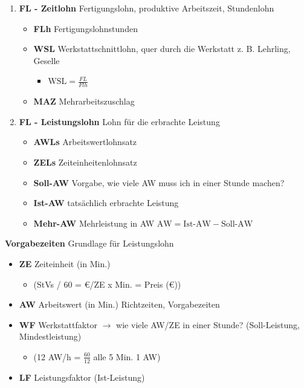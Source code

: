 \begin{enumerate}
\item
  \textbf{FL - Zeitlohn} Fertigungslohn, produktive Arbeitszeit,
  Stundenlohn

  \begin{itemize}
  \item
    \textbf{FLh} Fertigungslohnstunden
  \item
    \textbf{WSL} Werkstattschnittlohn, quer durch die Werkstatt z. B.
    Lehrling, Geselle

    \begin{itemize}
    \item
      $\boxed{\text{WSL} = \frac{FL}{Flh}}$
    \end{itemize}
  \item
    \textbf{MAZ} Mehrarbeitszuschlag
  \end{itemize}
\item
  \textbf{FL - Leistungslohn} Lohn für die erbrachte Leistung

  \begin{itemize}
  \item
    \textbf{AWLs} Arbeitswertlohnsatz
  \item
    \textbf{ZELs} Zeiteinheitenlohnsatz
  \item
    \textbf{Soll-AW} Vorgabe, wie viele AW muss ich in einer Stunde
    machen?
  \item
    \textbf{Ist-AW} tatsächlich erbrachte Leistung
  \item
    \textbf{Mehr-AW} Mehrleistung in AW
    $\boxed{\text{AW} = \text{Ist-AW} - \text{Soll-AW}}$
  \end{itemize}
\end{enumerate}

\textbf{Vorgabezeiten} Grundlage für Leistungslohn

\begin{itemize}
\item
  \textbf{ZE} Zeiteinheit (in Min.)

  \begin{itemize}
  \item
    (StVs / 60 = €/ZE x Min. = Preis (€))
  \end{itemize}
\item
  \textbf{AW} Arbeitswert (in Min.) Richtzeiten, Vorgabezeiten
\item
  \textbf{WF} Werkstattfaktor $\to$ wie viele AW/ZE in einer Stunde?
  (Soll-Leistung, Mindestleistung)

  \begin{itemize}
  \item
    (12 AW/h = $\frac{60}{12}$ alle 5 Min. 1 AW)
  \end{itemize}
\item
  \textbf{LF} Leistungsfaktor (Ist-Leistung)
\end{itemize}

